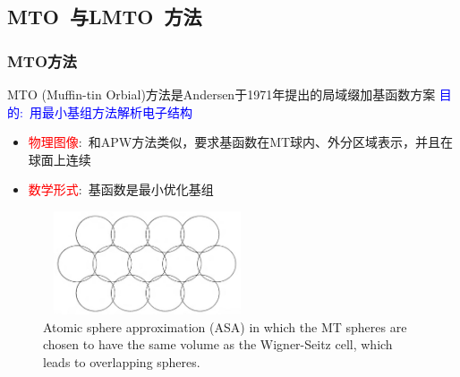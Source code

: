 \subsection{\rm{MTO~}与\rm{LMTO~}方法}
\frame
{
\frametitle{\textrm{MTO}方法}
\textrm{MTO (Muffin-tin Orbial)}方法是\textrm{Andersen}于\textrm{1971}年提出的局域缀加基函数方案
\vskip 5pt
\textcolor{blue}{目的:~用最小基组方法解析电子结构}
\begin{itemize}
	\item \textcolor{red}{物理图像}:~和\textrm{APW}方法类似，要求基函数在\textrm{MT}球内、外分区域表示，并且在球面上连续
	\item \textcolor{red}{数学形式}:~基函数是最小优化基组
\end{itemize}
\begin{figure}[h!]
	\vspace{-5pt}
\centering
\includegraphics[height=1.20in,width=2.42in,viewport=5 0 1005 495,clip]{Figures/Atomic_sphere-appro.png}
\caption{\fontsize{6.2pt}{4.2pt}\selectfont\textrm{Atomic sphere approximation (ASA) in which the MT spheres are chosen to have the same volume as the Wigner-Seitz cell, which leads to overlapping spheres.}}
\label{Atomic_sphere-appro}
\end{figure}
}

